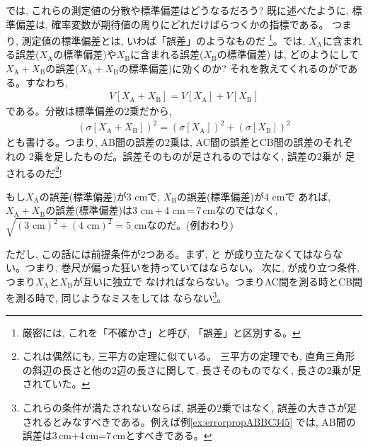 では, これらの測定値の分散や標準偏差はどうなるだろう? 既に述べたように, 
標準偏差は, 確率変数が期待値の周りにどれだけばらつくかの指標である。
つまり, 測定値の標準偏差とは, いわば「誤差」のようなものだ
\footnote{厳密には, これを「不確かさ」と呼び, 「誤差」と区別する。}。では, 
$X_{\text{A}}$に含まれる誤差($X_{\text{A}}$の標準偏差)や$X_{\text{B}}$に含まれる誤差($X_{\text{B}}$の標準偏差)
は, どのようにして$X_{\text{A}}+X_{\text{B}}$の誤差($X_{\text{A}}+X_{\text{B}}$の標準偏差)に効くのか?
それを教えてくれるのがである。すなわち, 
\begin{eqnarray}
V[X_{\text{A}}+X_{\text{B}}]=V[X_{\text{A}}]+V[X_{\text{B}}]
\end{eqnarray}
である。分散は標準偏差の2乗だから, 
\begin{eqnarray}
(\sigma[X_{\text{A}}+X_{\text{B}}])^2=(\sigma[X_{\text{A}}])^2+(\sigma [X_{\text{B}}])^2\label{eq:gosadenpa04}
\end{eqnarray}
とも書ける。つまり, AB間の誤差の2乗は, AC間の誤差とCB間の誤差のそれぞれの
2乗を足したものだ。誤差そのものが足されるのではなく, 誤差の2乗が
足されるのだ\footnote{これは偶然にも, 三平方の定理に似ている。 
三平方の定理でも, 直角三角形の斜辺の長さと他の2辺の長さに関して, 
長さそのものでなく, 長さの2乗が足されていた。}!

\begin{exmpl}\label{ex:errorpropABBC345}
もし$X_{\text{A}}$の誤差(標準偏差)が3$\,\,$cmで, $X_{\text{B}}$の誤差(標準偏差)が4$\,\,$cmで
あれば, $X_{\text{A}}+X_{\text{B}}$の誤差(標準偏差)は3$\,\,$cm\,+\,4$\,\,$cm\,=\,7$\,$cmなのではなく, 
$\sqrt{(3\,\,\text{cm})^2+(4\,\,\text{cm})^2}=5\,\,\text{cm}$なのだ。(例おわり)
\end{exmpl}

ただし, この話には前提条件が2つある。まず, と
が成り立たなくてはならない。つまり, 巻尺が偏った狂いを持っていてはならない。
次に, が成り立つ条件, つまり$X_{\text{A}}$と$X_{\text{B}}$が互いに独立で
なければならない。つまりAC間を測る時とCB間を測る時で, 同じようなミスをしては
ならない\footnote{これらの条件が満たされないならば, 誤差の2乗ではなく, 
誤差の大きさが足されるとみなすべきである。例えば例\ref{ex:errorpropABBC345}
では, AB間の誤差は3$\,$cm+4$\,$cm=7$\,$cmとすべきである。}。

